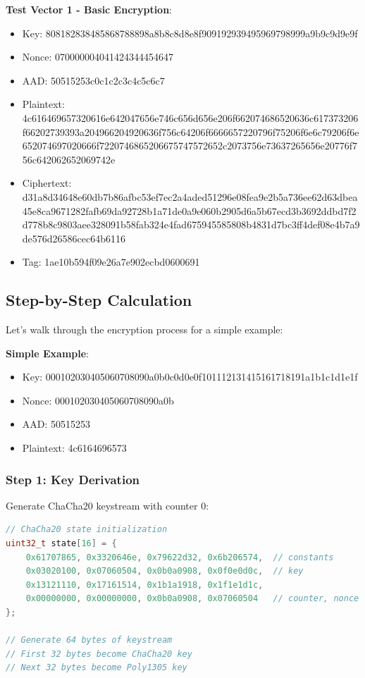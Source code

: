 \documentclass[11pt,a4paper]{article}
\begin{document}
\begin{examplebox}
\textbf{Test Vector 1 - Basic Encryption}:
\begin{itemize}
    \item Key: 808182838485868788898a8b8c8d8e8f909192939495969798999a9b9c9d9e9f
    \item Nonce: 070000004041424344454647
    \item AAD: 50515253c0c1c2c3c4c5c6c7
    \item Plaintext: 4c616469657320616e642047656e746c656d656e206f662074686520636c617373206f66202739393a204966204920636f756c64206f6666657220796f75206f6e6c79206f6e652074697020666f7220746865206675747572652c2073756e73637265656e20776f756c642062652069742e
    \item Ciphertext: d31a8d34648e60db7b86afbc53ef7ec2a4aded51296e08fea9e2b5a736ee62d63dbea45e8ca9671282fafb69da92728b1a71de0a9e060b2905d6a5b67ecd3b3692ddbd7f2d778b8c9803aee328091b58fab324e4fad675945585808b4831d7bc3ff4def08e4b7a9de576d26586cec64b6116
    \item Tag: 1ae10b594f09e26a7e902ecbd0600691
\end{itemize}
\end{examplebox}

\subsection{Step-by-Step Calculation}

Let's walk through the encryption process for a simple example:

\begin{examplebox}
\textbf{Simple Example}:
\begin{itemize}
    \item Key: 000102030405060708090a0b0c0d0e0f101112131415161718191a1b1c1d1e1f
    \item Nonce: 000102030405060708090a0b
    \item AAD: 50515253
    \item Plaintext: 4c6164696573
\end{itemize}
\end{examplebox}

\subsubsection{Step 1: Key Derivation}

Generate ChaCha20 keystream with counter 0:
\begin{lstlisting}[language=C++, caption=Key Derivation]
// ChaCha20 state initialization
uint32_t state[16] = {
    0x61707865, 0x3320646e, 0x79622d32, 0x6b206574,  // constants
    0x03020100, 0x07060504, 0x0b0a0908, 0x0f0e0d0c,  // key
    0x13121110, 0x17161514, 0x1b1a1918, 0x1f1e1d1c,
    0x00000000, 0x00000000, 0x0b0a0908, 0x07060504   // counter, nonce
};

// Generate 64 bytes of keystream
// First 32 bytes become ChaCha20 key
// Next 32 bytes become Poly1305 key
\end{lstlisting}
\end{document}
